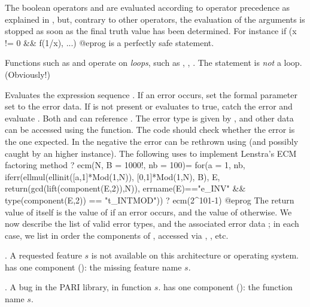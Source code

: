 The boolean operators \kbd{\&\&} and \kbd{||} are evaluated
according to operator precedence as explained in , but,
contrary to other operators, the evaluation of the arguments is stopped
as soon as the final truth value has been determined. For instance
\bprog
if (x != 0 && f(1/x), ...)
@eprog
\noindent is a perfectly safe statement.

 Functions such as  and  operate on
\emph{loops}, such as , , . The 
statement is \emph{not} a loop. (Obviously!)

\label{se:iferr}
Evaluates the expression sequence . If an error occurs,
set the formal parameter  set to the error data.
If  is not present or evaluates to true, catch the error
and evaluate . Both  and  can reference .
The error type is given by , and other data can be
accessed using the  function. The code  should check
whether the error is the one expected. In the negative the error can be
rethrown using  (and possibly caught by an higher 
instance). The following uses  to implement Lenstra's ECM factoring
 method
\bprog
? ecm(N, B = 1000!, nb = 100)=
  {
    for(a = 1, nb,
      iferr(ellmul(ellinit([a,1]*Mod(1,N)), [0,1]*Mod(1,N), B),
        E, return(gcd(lift(component(E,2)),N)),
        errname(E)=="e_INV" && type(component(E,2)) == "t_INTMOD"))
  }
? ecm(2^101-1)
@eprog
The return value of  itself is the value of  if an
error occurs, and the value of  otherwise. We now describe the
list of valid error types, and the associated error data ; in each
case, we list in order the components of , accessed via
, , etc.


 \item {}. A requested feature $s$ is not available on this
 architecture or operating system.
  has one component (): the missing feature name $s$.

 \item {}. A bug in the PARI library, in function $s$.
  has one component (): the function name $s$.

